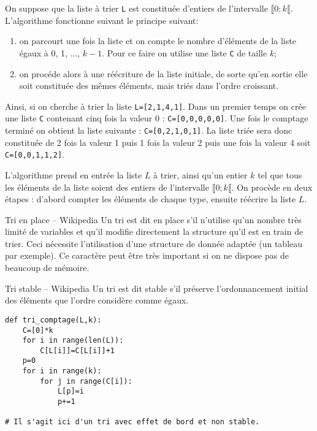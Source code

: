 
On suppose que la liste à trier \texttt{L} est constituée d’entiers de l’intervalle  $\llbracket 0; k \llbracket$. L’algorithme
fonctionne suivant le principe suivant: 
\begin{enumerate}
\item on parcourt une fois la liste et on compte le nombre d’éléments de
la liste égaux à 0, 1, ..., $k-1$. Pour ce faire on utilise une liste \texttt{C} de taille $k$;
\item on procéde alors à une réécriture de la liste initiale, de sorte qu’en sortie elle soit constituée des mêmes éléments, mais triés dans l’ordre
croissant.
\end{enumerate}

Ainsi, si on cherche à trier la liste \texttt{L=[2,1,4,1]}. Dans un premier temps on crée une liste \texttt{C} contenant cinq fois la valeur 0 : \texttt{C=[0,0,0,0,0]}. Une fois le comptage terminé on obtient la liste suivante : \texttt{C=[0,2,1,0,1]}. La liste triée sera donc constituée de 2 fois la valeur 1 puis 1 fois la valeur 2 puis une fois la valeur 4 soit \texttt{C=[0,0,1,1,2]}.



L’algorithme prend en entrée la liste $L$ à trier, ainsi qu’un entier $k$ tel que tous les éléments de la
liste soient des entiers de l’intervalle $\llbracket 0; k \llbracket$. On procède en deux étapes : d’abord compter les éléments de chaque type,
ensuite réécrire la liste $L$.



\begin{defi}{Tri en place -- Wikipedia}
Un tri est dit en place s'il n'utilise qu'un nombre très limité de variables et qu’il modifie directement la structure qu’il est en train de trier. Ceci nécessite l’utilisation d'une structure de donnée adaptée (un tableau par exemple). Ce caractère peut être très important si on ne dispose pas de beaucoup de mémoire.
\end{defi}

\begin{defi}{Tri stable  -- Wikipedia}
Un tri est dit stable s'il préserve l’ordonnancement initial des éléments que l'ordre considère comme égaux.
\end{defi}

\ifprof
\begin{lstlisting}
def tri_comptage(L,k):
    C=[0]*k
    for i in range(len(L)):
        C[L[i]]=C[L[i]]+1
    p=0
    for i in range(k):
        for j in range(C[i]):
            L[p]=i
            p+=1
            
# Il s'agit ici d'un tri avec effet de bord et non stable. 
\end{lstlisting}
\else
\fi